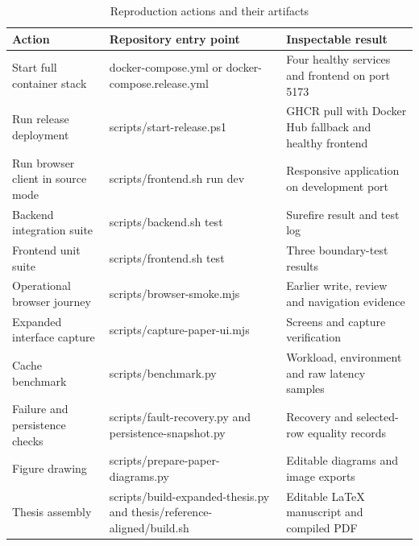 \begin{table}[htbp]\centering\small{}\setlength{\tabcolsep}{3pt}\renewcommand{\arraystretch}{1.25}
\caption{Reproduction actions and their artifacts}\label{tab:reproduce}
\begin{tabular}{>{\raggedright\arraybackslash}p{}>{\raggedright\arraybackslash}p{}>{\raggedright\arraybackslash}p{}}
\toprule
\textbf{Action} & \textbf{Repository entry point} & \textbf{Inspectable result} \\
\midrule
\leavevmode{}Start full container stack & \leavevmode{}docker-compose.yml or docker-compose.release.yml & \leavevmode{}Four healthy services and frontend on port 5173 \\
\leavevmode{}Run release deployment & \leavevmode{}scripts/\allowbreak{}start-release.ps1 & \leavevmode{}GHCR pull with Docker Hub fallback and healthy frontend \\
\leavevmode{}Run browser client in source mode & \leavevmode{}scripts/\allowbreak{}frontend.sh run dev & \leavevmode{}Responsive application on development port \\
\leavevmode{}Backend integration suite & \leavevmode{}scripts/\allowbreak{}backend.sh test & \leavevmode{}Surefire result and test log \\
\leavevmode{}Frontend unit suite & \leavevmode{}scripts/\allowbreak{}frontend.sh test & \leavevmode{}Three boundary-test results \\
\leavevmode{}Operational browser journey & \leavevmode{}scripts/\allowbreak{}browser-smoke.mjs & \leavevmode{}Earlier write, review and navigation evidence \\
\leavevmode{}Expanded interface capture & \leavevmode{}scripts/\allowbreak{}capture-paper-ui.mjs & \leavevmode{}Screens and capture verification \\
\leavevmode{}Cache benchmark & \leavevmode{}scripts/\allowbreak{}benchmark.py & \leavevmode{}Workload, environment and raw latency samples \\
\leavevmode{}Failure and persistence checks & \leavevmode{}scripts/\allowbreak{}fault-recovery.py and persistence-snapshot.py & \leavevmode{}Recovery and selected-row equality records \\
\leavevmode{}Figure drawing & \leavevmode{}scripts/\allowbreak{}prepare-paper-diagrams.py & \leavevmode{}Editable diagrams and image exports \\
\leavevmode{}Thesis assembly & \leavevmode{}scripts/\allowbreak{}build-expanded-thesis.py and thesis/\allowbreak{}reference-aligned/\allowbreak{}build.sh & \leavevmode{}Editable LaTeX manuscript and compiled PDF \\
\bottomrule\end{tabular}\end{table}

